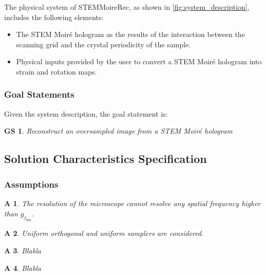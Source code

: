 \documentclass[12pt]{article}
\newcommand{\progname}{STEMMoireRec}
\newtheorem{GS}{GS}
\newtheorem{A}{A}
\begin{document}
The physical system of \progname{}, as shown in \cref{fig:system_description}, 
includes the following elements:
\begin{itemize}
\item The STEM Moir{\'e} hologram as the results of the interaction between the 
scanning grid and the crystal periodicity of the sample.
\item Physical inputs provided by the user to convert a STEM Moir{\'e} hologram 
into strain and rotation maps.
\end{itemize}


\subsubsection{Goal Statements}
\noindent Given the system description, the goal statement is:
\begin{GS}
\normalfont Reconstruct an oversampled image from a STEM Moir{\'e} hologram
\label{GS_1}
\end{GS}

\subsection{Solution Characteristics Specification}

\subsubsection{Assumptions}

\begin{A}
\normalfont The resolution of the microscope cannot resolve any spatial frequency higher than 
$g_{j_{\text{lim}}}$. 
\label{A_1}
\end{A}
\begin{A}
\normalfont Uniform orthogonal and uniform samplers are considered.
\label{A_2}
\end{A}
\begin{A}
\normalfont Blabla
\label{A_3}
\end{A}
\begin{A}
\label{A_4}
\normalfont Blabla
\end{A}
\end{document}
